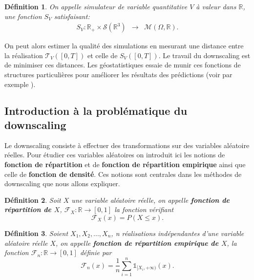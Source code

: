 \documentclass[a4paper,10pt]{article}
\newtheorem{definition}{Définition}
\begin{document}
\begin{definition}
	\label{simu_terre}
	On appelle simulateur de variable quantitative $V$ à valeur dans $\mathbb{R}$, une fonction $S_V$ satisfaisant:
	\begin{equation}
		\begin{array}{ccc}
			S_V: \mathbb{R}_{+}\times\mathcal{S}(\mathbb{R}^{3}) & \to & \mathcal{M}(\Omega,\mathbb{R}).
		\end{array}
	\end{equation}
\end{definition}

On peut alors estimer la qualité des simulations en mesurant une distance entre la réalisation $\mathcal{T}_V([0,T])$ et celle de $S_V([0,T])$. Le travail du downscaling est de minimiser ces distances. Les géostatistiques essaie de munir ces fonctions de structures particulières pour améliorer les résultats des prédictions (voir par exemple \cite{lindgren2011explicit}).  

\subsection{Introduction à la problématique du downscaling}
\label{intro-dwnsc}
Le downscaling consiste à effectuer des transformations sur des variables aléatoire réelles. Pour étudier ces variables aléatoires on introduit ici les notions de \textbf{fonction de répartition} et de \textbf{fonction de répartition empirique} ainsi que celle de \textbf{fonction de densité}. Ces notions sont centrales dans les méthodes de downscaling que nous allons expliquer.

\begin{definition}
	Soit $X$ une variable aléatoire réelle, on appelle \textbf{fonction de répartition de $X$}, $\mathcal{F}_{X}: \mathbb{R}\to [0,1]$ la fonction vérifiant
	\begin{equation}
		\mathcal{F}_{X}(x)=P(X\leq x).
	\end{equation}
\end{definition}

\begin{definition}
	Soient $X_1,X_2,...,X_n$, n réalisations indépendantes d'une variable aléatoire réelle $X$, on appelle \textbf{fonction de répartition empirique de $X$}, la fonction $\mathcal{F}_{n}:\mathbb{R}\to [0,1]$ définie par
	\begin{equation}
		\mathcal{F}_{n}(x)= \frac{1}{n}\sum_{i=1}^{n}\mathds{1}_{[X_i, +\infty )}(x).
	\end{equation}
\end{definition}
\end{document}
